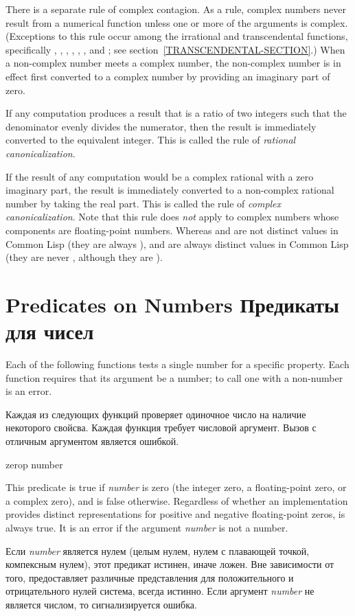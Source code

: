 There is a separate rule of complex contagion.
As a rule, complex numbers never result from a numerical function
unless one or more of the
arguments is complex.  (Exceptions to this
rule occur among the irrational and transcendental functions,
specifically , , ,
, , , and ;
see section~\ref{TRANSCENDENTAL-SECTION}.)
When a non-complex number meets a complex number, the non-complex
number is in effect first converted to a complex number by providing an
imaginary part of zero.

If any computation produces a result that is a ratio of
two integers such that the denominator evenly divides the
numerator, then the result is immediately converted to the equivalent
integer.  This is called the rule of \emph{rational canonicalization}.

If the result of any computation would be a complex rational
with a zero imaginary part, the result is immediately
converted to a non-complex rational number by taking the
real part.  This is called the rule of \emph{complex canonicalization}.
Note that this rule does \emph{not} apply to complex numbers whose components
are floating-point numbers.  Whereas  and  are not
distinct values in Common Lisp (they are always ),
 and  are always distinct values in Common Lisp
(they are never , although they are ).

\section{Predicates on Numbers Предикаты для чисел}

Each of the following functions tests a single number for
a specific property.
Each function requires that its argument be
a number; to call one with a non-number is an error.

Каждая из следующих функций проверяет одиночное число на наличие некоторого
свойсва.
Каждая функция требует числовой аргумент. Вызов с отличным аргументом является
ошибкой.

\begin{defun}[Function]
zerop number

This predicate is true if \emph{number} is zero (the integer zero,
a floating-point zero, or a complex zero), and is false otherwise.
Regardless of whether an implementation provides distinct representations
for positive and negative floating-point zeros,
 is always true.
It is an error if the argument \emph{number} is not a number.

Если \emph{number} является нулем (целым нулем, нулем с
плавающей точкой, компексным нулем), этот предикат истинен, иначе ложен.
Вне зависимости от того, предоставляет различные представления для
положительного и отрицательного нулей система,  всегда истинно.
Если аргумент \emph{number} не является числом, то сигнализируется ошибка.
\end{defun}

